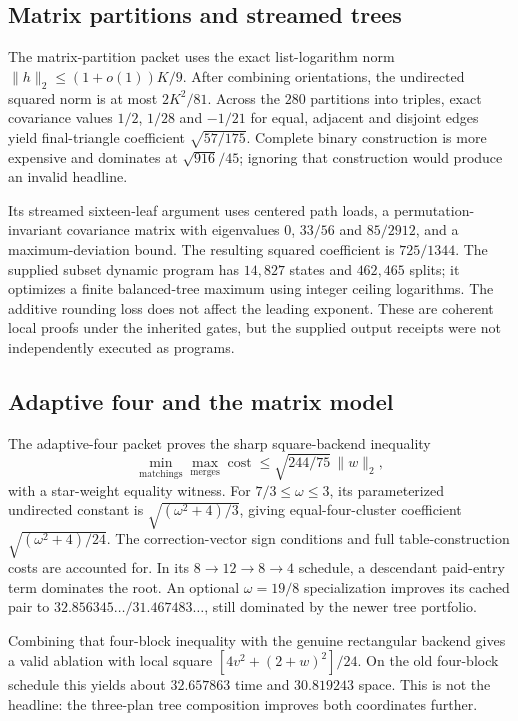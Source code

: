 \documentclass[11pt,letterpaper]{article}
\theoremstyle{remark}\newtheorem{remark}[theorem]{Remark}
\begin{document}
\subsection{Matrix partitions and streamed trees}
The matrix-partition packet uses the exact list-logarithm norm $\|h\|_2\le(1+o(1))K/9$. After combining orientations, the undirected squared norm is at most $2K^2/81$. Across the $280$ partitions into triples, exact covariance values $1/2$, $1/28$ and $-1/21$ for equal, adjacent and disjoint edges yield final-triangle coefficient $\sqrt{57/175}$. Complete binary construction is more expensive and dominates at $\sqrt{916}/45$; ignoring that construction would produce an invalid headline.

Its streamed sixteen-leaf argument uses centered path loads, a permutation-invariant covariance matrix with eigenvalues $0$, $33/56$ and $85/2912$, and a maximum-deviation bound. The resulting squared coefficient is $725/1344$. The supplied subset dynamic program has $14{,}827$ states and $462{,}465$ splits; it optimizes a finite balanced-tree maximum using integer ceiling logarithms. The additive rounding loss does not affect the leading exponent. These are coherent local proofs under the inherited gates, but the supplied output receipts were not independently executed as programs.

\subsection{Adaptive four and the matrix model}
The adaptive-four packet proves the sharp square-backend inequality
\[
 \min_{\text{matchings}}\max_{\text{merges}}\operatorname{cost}
 \le\sqrt{244/75}\,\|w\|_2,
\]
with a star-weight equality witness. For $7/3\le\omega\le3$, its parameterized undirected constant is $\sqrt{(\omega^2+4)/3}$, giving equal-four-cluster coefficient $\sqrt{(\omega^2+4)/24}$. The correction-vector sign conditions and full table-construction costs are accounted for. In its $8\to12\to8\to4$ schedule, a descendant paid-entry term dominates the root. An optional $\omega=19/8$ specialization improves its cached pair to $32.856345\ldots/31.467483\ldots$, still dominated by the newer tree portfolio.

Combining that four-block inequality with the genuine rectangular backend gives a valid ablation with local square $[4v^2+(2+w)^2]/24$. On the old four-block schedule this yields about $32.657863$ time and $30.819243$ space. This is not the headline: the three-plan tree composition improves both coordinates further.
\end{document}
